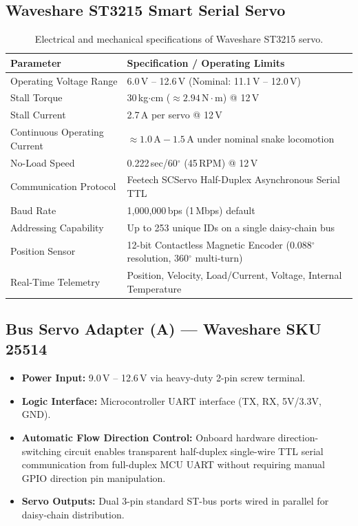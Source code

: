 \documentclass[11pt,a4paper]{article}
\begin{document}
\subsection{Waveshare ST3215 Smart Serial Servo}
\begin{table}[h!]
\centering
\small
\renewcommand{\arraystretch}{1.2}
\begin{tabularx}{\textwidth}{l X}
\toprule
\textbf{Parameter} & \textbf{Specification / Operating Limits} \\
\midrule
Operating Voltage Range & 6.0\,V -- 12.6\,V (Nominal: 11.1\,V -- 12.0\,V) \\
Stall Torque & 30\,kg$\cdot$cm ($\approx 2.94\,\text{N}\cdot\text{m}$) @ 12\,V \\
Stall Current & 2.7\,A per servo @ 12\,V \\
Continuous Operating Current & $\approx 1.0\,\text{A} - 1.5\,\text{A}$ under nominal snake locomotion \\
No-Load Speed & 0.222\,sec/60$^\circ$ (45\,RPM) @ 12\,V \\
Communication Protocol & Feetech SCServo Half-Duplex Asynchronous Serial TTL \\
Baud Rate & 1,000,000\,bps (1\,Mbps) default \\
Addressing Capability & Up to 253 unique IDs on a single daisy-chain bus \\
Position Sensor & 12-bit Contactless Magnetic Encoder (0.088$^\circ$ resolution, 360$^\circ$ multi-turn) \\
Real-Time Telemetry & Position, Velocity, Load/Current, Voltage, Internal Temperature \\
\bottomrule
\end{tabularx}
\caption{Electrical and mechanical specifications of Waveshare ST3215 servo.}
\end{table}

\subsection{Bus Servo Adapter (A) --- Waveshare SKU 25514}
\begin{itemize}[leftmargin=1.5em, itemsep=0.2em]
    \item \textbf{Power Input:} 9.0\,V -- 12.6\,V via heavy-duty 2-pin screw terminal.
    \item \textbf{Logic Interface:} Microcontroller UART interface (TX, RX, 5V/3.3V, GND).
    \item \textbf{Automatic Flow Direction Control:} Onboard hardware direction-switching circuit enables transparent half-duplex single-wire TTL serial communication from full-duplex MCU UART without requiring manual GPIO direction pin manipulation.
    \item \textbf{Servo Outputs:} Dual 3-pin standard ST-bus ports wired in parallel for daisy-chain distribution.
\end{itemize}
\end{document}
